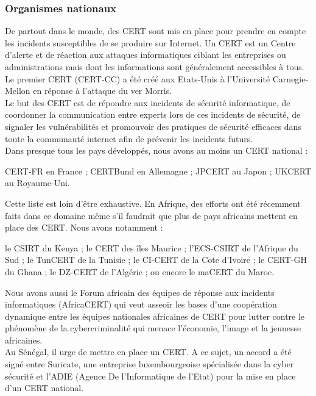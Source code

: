 \subsubsection{Organismes nationaux}
De partout dans le monde, des CERT sont mis en place pour prendre en compte les incidents susceptibles de se produire sur Internet. Un CERT est un Centre d’alerte et de réaction aux attaques informatiques ciblant les entreprises ou administrations mais dont les informations sont généralement accessibles à tous. Le premier CERT (CERT-CC) a été créé aux Etats-Unis à l’Université Carnegie-Mellon en réponse à l’attaque du ver Morris. \\
Le but des CERT est de répondre aux incidents de sécurité informatique, de coordonner la communication entre experts lors de ces incidents de sécurité, de signaler les vulnérabilités et promouvoir des pratiques de sécurité efficaces dans toute la communauté internet afin de prévenir les incidents futurs. \\
Dans presque tous les pays développés, nous avons au moins un CERT national :
\begin{itemize}
	\itemtirait CERT-FR en France ;
	\itemtirait CERTBund en Allemagne ; 
	\itemtirait JPCERT au Japon ;
	\itemtirait UKCERT au Royaume-Uni.
\end{itemize}
Cette liste est loin d'être exhaustive.
En Afrique, des efforts ont été récemment faits  dans ce domaine même s’il faudrait que plus de pays africains mettent en place des CERT. Nous avons notamment :
\begin{itemize}
	\itemtirait le CSIRT du Kenya ;
	\itemtirait le CERT des îles Maurice ;
	\itemtirait l’ECS-CSIRT de l’Afrique du Sud ;
	\itemtirait le TunCERT de la Tunisie ;
	\itemtirait le CI-CERT de la Cote d’Ivoire ;
	\itemtirait le CERT-GH du Ghana ;
	\itemtirait le DZ-CERT de l’Algérie ;
	\itemtirait ou encore le maCERT du Maroc.
\end{itemize}
Nous avons aussi le Forum africain des équipes de réponse aux incidents informatiques (AfricaCERT) qui veut asseoir les bases d’une coopération dynamique entre les équipes nationales africaines de CERT pour lutter contre le phénomène de la cybercriminalité qui menace l’économie, l’image et la jeunesse africaines.\\
Au Sénégal, il urge de mettre en place un CERT. A ce sujet, un accord a été signé entre Suricate, une entreprise luxembourgeoise spécialisée dans la cyber sécurité et l'ADIE (Agence De l'Informatique de l'Etat) pour la mise en place d'un CERT national. \\
